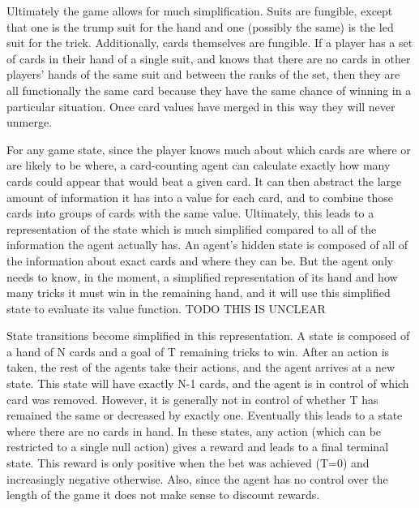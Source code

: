 \documentclass[10pt]{article} %
\begin{document}
Ultimately the game allows for much simplification. Suits are fungible, except that one is the trump suit for the hand and one (possibly the same) is the led suit for the trick. Additionally, cards themselves are fungible. If a player has a set of cards in their hand of a single suit, and knows that there are no cards in other players’ hands of the same suit and between the ranks of the set, then they are all functionally the same card because they have the same chance of winning in a particular situation. Once card values have merged in this way they will never unmerge.

For any game state, since the player knows much about which cards are where or are likely to be where, a card-counting agent can calculate exactly how many cards could appear that would beat a given card. It can then abstract the large amount of information it has into a value for each card, and to combine those cards into groups of cards with the same value. Ultimately, this leads to a representation of the state which is much simplified compared to all of the information the agent actually has. An agent's hidden state is composed of all of the information about exact cards and where they can be. But the agent only needs to know, in the moment, a simplified representation of its hand and how many tricks it must win in the remaining hand, and it will use this simplified state to evaluate its value function. TODO THIS IS UNCLEAR

State transitions become simplified in this representation. A state is composed of a hand of N cards and a goal of T remaining tricks to win. After an action is taken, the rest of the agents take their actions, and the agent arrives at a new state. This state will have exactly N-1 cards, and the agent is in control of which card was removed. However, it is generally not in control of whether T has remained the same or decreased by exactly one. Eventually this leads to a state where there are no cards in hand. In these states, any action (which can be restricted to a single null action) gives a reward and leads to a final terminal state. This reward is only positive when the bet was achieved (T=0) and increasingly negative otherwise. Also, since the agent has no control over the length of the game it does not make sense to discount rewards.
\end{document}

